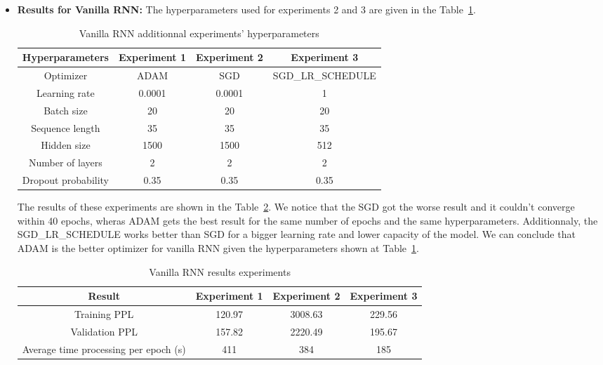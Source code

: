 \begin{itemize}
	\item[1)] \textbf{Results for Vanilla RNN:}
	The hyperparameters used for experiments 2 and 3 are given in the Table~\ref{table:3}.\\
	\begin{table}[H]
		\centering
		\begin{tabular}{||c c c c||} 
			\hline
			\textbf{Hyperparameters} & \textbf{Experiment 1} &\textbf{Experiment 2} & \textbf{Experiment 3}\\[0.5ex] 
			\hline
			Optimizer & ADAM & SGD & SGD\_LR\_SCHEDULE \\
			Learning rate & 0.0001 & 0.0001 & 1  \\
			Batch size &20 & 20 &20 \\
			Sequence length &35 & 35 & 35\\
			Hidden size & 1500 & 1500 & 512 \\
			Number of layers & 2 & 2 & 2 \\
			Dropout probability & 0.35 & 0.35 &0.35 \\[1ex]
			\hline
		\end{tabular}
		\caption{Vanilla RNN additionnal experiments' hyperparameters}
		\label{table:3}
	\end{table}
	The results of these experiments are shown in the Table~\ref{table:3.1}. We notice that the SGD got the worse result and it couldn't converge within 40 epochs, wheras ADAM gets the best result for the same number of epochs and the same hyperparameters. Additionnaly, the SGD\_LR\_SCHEDULE works better than SGD for a bigger learning rate and lower capacity of the model. We can conclude that ADAM is the better optimizer for vanilla RNN given the hyperparameters shown at Table~\ref{table:3}.
	\begin{table}[H]
		\centering
		\begin{tabular}{||c c c c||} 
			\hline
			\textbf{Result} & \textbf{Experiment 1} & \textbf{Experiment 2}& \textbf{Experiment 3} \\[0.5ex] 
			\hline
			Training PPL & 120.97 & 3008.63 & 229.56 \\
			Validation PPL & 157.82 & 2220.49 & 195.67  \\
			Average time processing per epoch (s) & 411 & 384 & 185 \\[1ex]
			\hline
		\end{tabular}
		\caption{Vanilla RNN results experiments}
		\label{table:3.1}
	\end{table}

\end{itemize}

